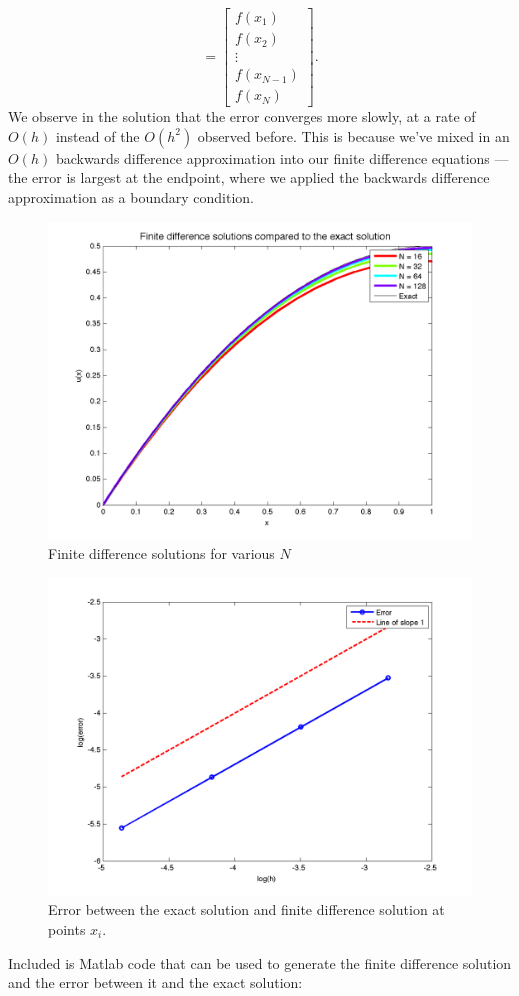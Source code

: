 {\begin{solution}
\begin{enumerate}
\[ =   \left[\begin{array}{c} f(x_1) \\[0.25em] f(x_2) \\[0.25em] \vdots \\[0.25em] f(x_{N-1}) \\[0.25em] f(x_N) \end{array}\right].
\]
We observe in the solution that the error converges more slowly, at a rate of $O(h)$ instead of the $O(h^2)$ observed before.  This is because we've mixed in an $O(h)$ backwards difference approximation into our finite difference equations --- the error is largest at the endpoint, where we applied the backwards difference approximation as a boundary condition.
\begin{figure}
\centering
\includegraphics[width=.8\textwidth]{p3c_sol.png}
\caption{Finite difference solutions for various $N$}
\end{figure}
\begin{figure}
\centering
\includegraphics[width=.8\textwidth]{p3c_error.png}
\caption{Error between the exact solution and finite difference solution at points $x_i$.}
\end{figure}

Included is Matlab code that can be used to generate the finite difference solution and the error between it and the exact solution:


\end{enumerate}
\end{solution}
}

